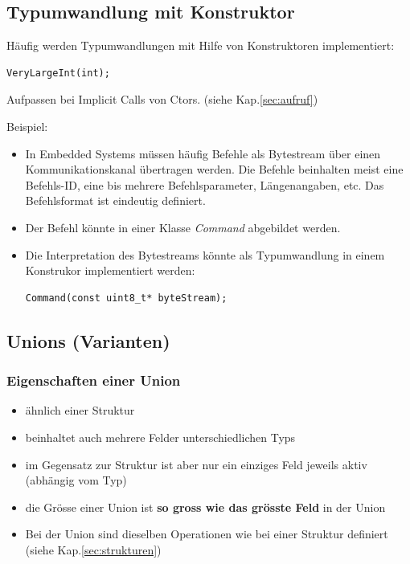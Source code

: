\subsection{Typumwandlung mit Konstruktor}
Häufig werden Typumwandlungen mit Hilfe von Konstruktoren implementiert:\\
	\vspace{-\baselineskip}
	\begin{minipage}{0.3\linewidth}
\begin{lstlisting}
VeryLargeInt(int);
\end{lstlisting}
	\end{minipage}
	\item[\-] \begin{achtung}
		  Aufpassen bei Implicit Calls von Ctors. (siehe Kap.\ref{sec:aufruf})
		  \end{achtung}
Beispiel:
\begin{itemize}
	\item In Embedded Systems müssen häufig Befehle als Bytestream über einen Kommunikationskanal übertragen werden. Die Befehle beinhalten meist eine Befehls-ID, eine bis mehrere Befehlsparameter, Längenangaben, etc. Das Befehlsformat ist eindeutig definiert.
	\item Der Befehl könnte in einer Klasse \emph{Command} abgebildet werden.
	\item Die Interpretation des Bytestreams könnte als Typumwandlung in einem Konstrukor implementiert werden:\\
	\vspace{-\baselineskip}
	\begin{minipage}{0.45\linewidth}
\begin{lstlisting}
Command(const uint8_t* byteStream);
\end{lstlisting}
	\end{minipage}
\end{itemize}

\subsection{Unions (Varianten)}

\subsubsection{Eigenschaften einer Union}
\begin{itemize}
	\item ähnlich einer Struktur
	\item beinhaltet auch mehrere Felder unterschiedlichen Typs
	\item im Gegensatz zur Struktur ist aber nur ein einziges Feld jeweils aktiv (abhängig vom Typ)
	\item die Grösse einer Union ist \textbf{so gross wie das grösste Feld} in der Union
	\item Bei der Union sind dieselben Operationen wie bei einer Struktur definiert (siehe Kap.\ref{sec:strukturen})
\end{itemize}

